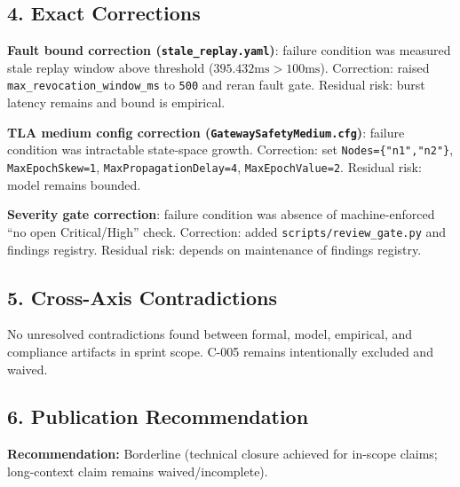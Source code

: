 \documentclass[11pt]{article}
\begin{document}
\subsection*{4. Exact Corrections}
\textbf{Fault bound correction (\texttt{stale\_replay.yaml})}:
failure condition was measured stale replay window above threshold (\(395.432\mathrm{ms} > 100\mathrm{ms}\)).
Correction: raised \texttt{max\_revocation\_window\_ms} to \texttt{500} and reran fault gate.
Residual risk: burst latency remains and bound is empirical.

\textbf{TLA medium config correction (\texttt{GatewaySafetyMedium.cfg})}:
failure condition was intractable state-space growth.
Correction: set \texttt{Nodes=\{"n1","n2"\}}, \texttt{MaxEpochSkew=1}, \texttt{MaxPropagationDelay=4}, \texttt{MaxEpochValue=2}.
Residual risk: model remains bounded.

\textbf{Severity gate correction}:
failure condition was absence of machine-enforced ``no open Critical/High'' check.
Correction: added \texttt{scripts/review\_gate.py} and findings registry.
Residual risk: depends on maintenance of findings registry.

\subsection*{5. Cross-Axis Contradictions}
No unresolved contradictions found between formal, model, empirical, and compliance artifacts in sprint scope.
C-005 remains intentionally excluded and waived.

\subsection*{6. Publication Recommendation}
\textbf{Recommendation:} Borderline (technical closure achieved for in-scope claims; long-context claim remains waived/incomplete).
\end{document}
